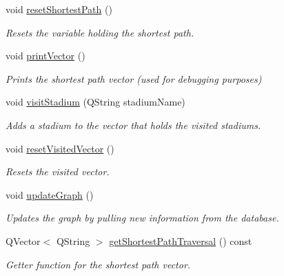 \begin{DoxyCompactItemize}
\mbox{\label{class_graph_a11d2030a49b2e48799c8b4b4144b32cb}} 
void \hyperlink{class_graph_a11d2030a49b2e48799c8b4b4144b32cb}{reset\+Shortest\+Path} ()
\begin{DoxyCompactList}\small\item\em Resets the variable holding the shortest path. \end{DoxyCompactList}\item 
\mbox{\label{class_graph_a2e65fe91a3533825a241601f483f4ecb}} 
void \hyperlink{class_graph_a2e65fe91a3533825a241601f483f4ecb}{print\+Vector} ()
\begin{DoxyCompactList}\small\item\em Prints the shortest path vector (used for debugging purposes) \end{DoxyCompactList}\item 
void \hyperlink{class_graph_aaeaed59906eb9fbacb946b053ab5a9e0}{visit\+Stadium} (Q\+String stadium\+Name)
\begin{DoxyCompactList}\small\item\em Adds a stadium to the vector that holds the visited stadiums. \end{DoxyCompactList}\item 
\mbox{\label{class_graph_a0d917e220a8a7fb9efc987e02e42aae2}} 
void \hyperlink{class_graph_a0d917e220a8a7fb9efc987e02e42aae2}{reset\+Visited\+Vector} ()
\begin{DoxyCompactList}\small\item\em Resets the visited vector. \end{DoxyCompactList}\item 
\mbox{\label{class_graph_a187472c9e3721253d55ea716e6ebd2af}} 
void \hyperlink{class_graph_a187472c9e3721253d55ea716e6ebd2af}{update\+Graph} ()
\begin{DoxyCompactList}\small\item\em Updates the graph by pulling new information from the database. \end{DoxyCompactList}\item 
Q\+Vector$<$ Q\+String $>$ \hyperlink{class_graph_ace289afb1c130cf4db09e4d1f2180d67}{get\+Shortest\+Path\+Traversal} () const
\begin{DoxyCompactList}\small\item\em Getter function for the shortest path vector. \end{DoxyCompactList}\item 

\end{DoxyCompactItemize}

